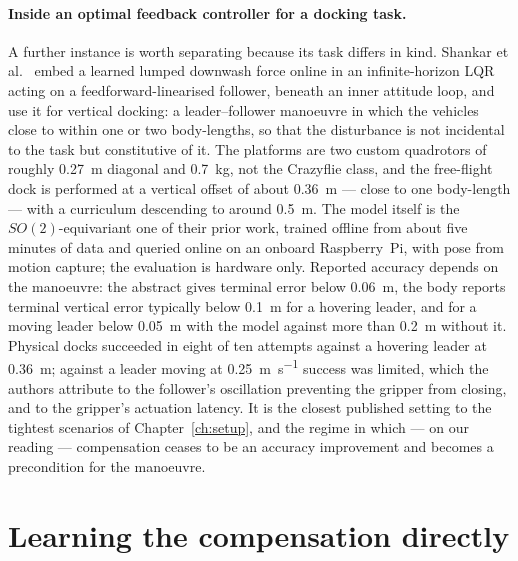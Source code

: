 \paragraph{Inside an optimal feedback controller for a docking task.}
A further instance is worth separating because its task differs in kind. Shankar et
al.~\cite{shankar2023docking} embed a learned lumped downwash force online in an infinite-horizon
LQR acting on a feedforward-linearised follower, beneath an inner attitude loop, and use it for
vertical docking: a leader--follower manoeuvre in which the vehicles close to within one or two
body-lengths, so that the disturbance is not incidental to the task but constitutive of it. The
platforms are two custom quadrotors of roughly \SI{0.27}{\metre} diagonal and \SI{0.7}{\kilo\gram},
not the Crazyflie class, and the free-flight dock is performed at a vertical offset of about
\SI{0.36}{\metre} --- close to one body-length --- with a curriculum descending to around
\SI{0.5}{\metre}. The model itself is the $SO(2)$-equivariant one of their prior work, trained
offline from about five minutes of data and queried online on an onboard Raspberry~Pi, with pose
from motion capture; the evaluation is hardware only. Reported accuracy depends on the manoeuvre:
the abstract gives terminal error below \SI{0.06}{\metre}, the body reports terminal vertical error
typically below \SI{0.1}{\metre} for a hovering leader, and for a moving leader below
\SI{0.05}{\metre} with the model against more than \SI{0.2}{\metre} without it. Physical docks
succeeded in eight of ten attempts against a hovering leader at \SI{0.36}{\metre}; against a leader
moving at \SI{0.25}{\metre\per\second} success was limited, which the authors attribute to the
follower's oscillation preventing the gripper from closing, and to the gripper's actuation
latency.
It is the closest published setting to the tightest
scenarios of Chapter~\ref{ch:setup}, and the regime in which --- on our reading ---
compensation ceases to be an accuracy improvement and becomes a precondition for the manoeuvre.

\section{Learning the compensation directly}
\label{sec:rw-rl}

